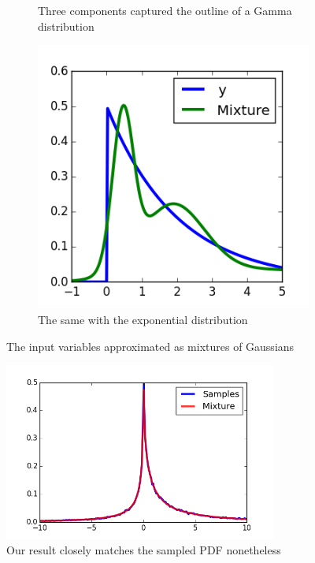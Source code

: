 \documentclass[11pt,a4paper]{book}
\begin{document}
\begin{figure}[h]
\begin{subfigure}[t]{0.3\textwidth}
    \caption{Three components captured the outline of a Gamma distribution}
  \end{subfigure}
  \hfill
  \begin{subfigure}[t]{0.3\textwidth}
    \centering
    \includegraphics[width=\textwidth]{thesis/complex/introduction-var-y}
    \caption{The same with the exponential distribution}
  \end{subfigure}
  \caption{The input variables approximated as mixtures of Gaussians}
  \label{fig:introduction-vars}
\end{figure}
\begin{figure}
  \centering
  \includegraphics[width=0.8\textwidth]{thesis/complex/introduction-result}
  \caption{Our result closely matches the sampled PDF nonetheless}
  \label{fig:introduction-result}
\end{figure}
\end{document}
